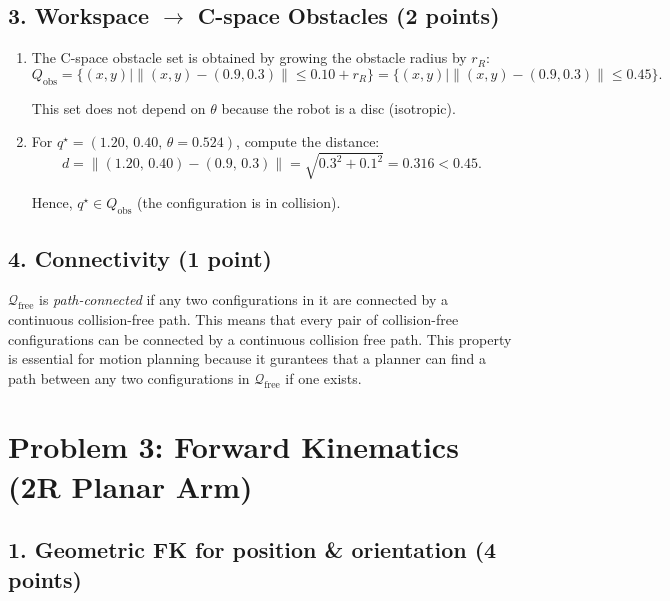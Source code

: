 \documentclass[11pt]{article}
\begin{document}
\subsection*{3. Workspace $\to$ C-space Obstacles (2 points)}

\begin{enumerate}[label=(\alph*)]
    \item The C-space obstacle set is obtained by growing the obstacle radius by $r_R$:
    \[
    Q_{\text{obs}} = \{(x,y) \mid \|(x,y) - (0.9,0.3)\| \leq 0.10 + r_R\}
    = \{(x,y) \mid \|(x,y) - (0.9,0.3)\| \leq 0.45\}.
    \]

    This set does not depend on $\theta$ because the robot is a disc (isotropic).

    \item For $q^\star = (1.20,\,0.40,\,\theta=0.524)$, compute the distance:
    \[
    d = \|(1.20,\,0.40) - (0.9,\,0.3)\|
      = \sqrt{0.3^2 + 0.1^2}
      = 0.316 < 0.45.
    \]

    Hence, $q^\star \in Q_{\text{obs}}$ (the configuration is in collision).
\end{enumerate}



\subsection*{4. Connectivity (1 point)}
$\mathcal{Q}_{\text{free}}$ is \emph{path-connected} if any two configurations in it are connected by a continuous collision-free path. This means that every pair of collision-free configurations can be connected by a continuous collision free path. This property is essential for motion planning because it gurantees that a planner can find a path between any two configurations in $\mathcal{Q}_{\text{free}}$ if one exists.

\section*{Problem 3: Forward Kinematics (2R Planar Arm)}

\subsection*{1. Geometric FK for position \& orientation (4 points)}
\end{document}
